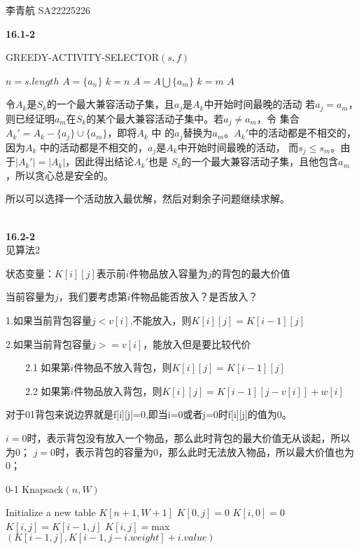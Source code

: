 \documentclass[UTF8]{ctexart}
\begin{document}
李青航 SA22225226

\noindent\textbf{16.1-2 }

\begin{algorithm}
	\caption {GREEDY-ACTIVITY-SELECTOR$(s,f)$}
	\begin{algorithmic}[1]
		\STATE $n=s.length$
        \STATE $A=\{a_n\}$
        \STATE $k=n$
                \STATE $A=A\bigcup \{a_m\}$
                \STATE $k=m$
            \ENDIF
        \ENDFOR
        \RETURN $A$
	\end{algorithmic}
\end{algorithm}

令$A_k$是$S_k$的一个最大兼容活动子集，且$a_j$是$A_k$中开始时间最晚的活动
若$a_j=a_m$，则已经证明$a_m$在$S_k$的某个最大兼容活动子集中。若$a_j\neq a_m$，令
集合$A_k' = A_k-\{a_j\}\cup \{a_m\}$，即将$A_k$
中 的$a_j$替换为$a_m$。$A_k'$中的活动都是不相交的，因为$A_k$
中的活动都是不相交的，$a_j$是$A_k$中开始时间最晚的活动，
而$s_j\le s_m$。由于$|A_k ' |=|A_k|$，因此得出结论$A_k'$也是
$S_k$的一个最大兼容活动子集，且他包含$a_m$，所以贪心总是安全的。

所以可以选择一个活动放入最优解，然后对剩余子问题继续求解。

~\\
\noindent\textbf{16.2-2 }\\
见算法2

状态变量：$K[i][j]$表示前$i$件物品放入容量为$j$的背包的最大价值

当前容量为$j$，我们要考虑第$i$件物品能否放入？是否放入？

1.如果当前背包容量$j<v[i]$,不能放入，则$K[i][j]=K[i-1][j]$

2.如果当前背包容量$j>=v[i]$，能放入但是要比较代价

~~~~2.1 如果第$i$件物品不放入背包，则$K[i][j]=K[i-1][j]$

~~~~2.2 如果第$i$件物品放入背包，则$K[i][j]=K[i-1][j-v[i]]+w[i]$

对于01背包来说边界就是f[i][j]=0,即当i=0或者j=0时f[i][j]的值为0。

$i=0$时，表示背包没有放入一个物品，那么此时背包的最大价值无从谈起，所以为0；
$j=0$时，表示背包的容量为0，那么此时无法放入物品，所以最大价值也为0；

\begin{algorithm}
    \caption {0-1 Knapsack$(n,W)$}
    \begin{algorithmic}
        \STATE Initialize a new table $K[n+1,W+1]$
            \STATE $K[0,j]=0$
        \ENDFOR
            \STATE $K[i,0]=0$
        \ENDFOR
                    \STATE $K[i,j]=K[i-1,j]$
                \ENDIF
                \STATE $K[i,j]=$max$(K[i-1,j],K[i-1,j-i.weight]+i.value)$
            \ENDFOR
        \ENDFOR
    \end{algorithmic}
\end{algorithm}
\end{document}
